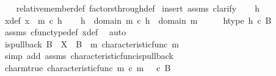 \begin{isabellebody}
%
\isadelimproof
\ \ %
\endisadelimproof
%
\isatagproof
{}\isamarkupfalse%
\ relative{\isacharunderscore}{\kern0pt}member{\isacharunderscore}{\kern0pt}def{}\ factors{\isacharunderscore}{\kern0pt}through{\isacharunderscore}{\kern0pt}def\isanewline
{}\isamarkupfalse%
\ {\isacharparenleft}{\kern0pt}insert\ assms{\isacharcomma}{\kern0pt}\ clarify{\isacharparenright}{\kern0pt}\isanewline
\ \ \isamarkupfalse%
\ h\isanewline
\ \ \isamarkupfalse%
\ x{\isacharunderscore}{\kern0pt}def{\isacharcolon}{\kern0pt}\ {\isachardoublequoteopen}x\ {\isacharequal}{\kern0pt}\ m\ {\isasymcirc}\isactrlsub c\ h{\isachardoublequoteclose}\isanewline
\ \ \isamarkupfalse%
\ {\isachardoublequoteopen}h\ {\isacharcolon}{\kern0pt}\ domain\ {\isacharparenleft}{\kern0pt}m\ {\isasymcirc}\isactrlsub c\ h{\isacharparenright}{\kern0pt}\ {\isasymrightarrow}\ domain\ m{\isachardoublequoteclose}\isanewline
\ \ \isamarkupfalse%
\ \isamarkupfalse%
\ h{\isacharunderscore}{\kern0pt}type{\isacharcolon}{\kern0pt}\ {\isachardoublequoteopen}h\ {\isasymin}\isactrlsub c\ B{\isachardoublequoteclose}\isanewline
\ \ \ \ \isamarkupfalse%
\ assms{\isacharparenleft}{\kern0pt}{}{\isacharcomma}{\kern0pt}{}{\isacharparenright}{\kern0pt}\ cfunc{\isacharunderscore}{\kern0pt}type{\isacharunderscore}{\kern0pt}def\ x{\isacharunderscore}{\kern0pt}def\ \isamarkupfalse%
\ auto\isanewline
\isanewline
\ \ \isamarkupfalse%
\ {\isachardoublequoteopen}is{\isacharunderscore}{\kern0pt}pullback\ B\ {\isasymone}\ X\ {\isasymOmega}\ {\isacharparenleft}{\kern0pt}{\isasymbeta}\isactrlbsub B\isactrlesub {\isacharparenright}{\kern0pt}\ {\isasymt}\ m\ {\isacharparenleft}{\kern0pt}characteristic{\isacharunderscore}{\kern0pt}func\ m{\isacharparenright}{\kern0pt}{\isachardoublequoteclose}\isanewline
\ \ \ \ \isamarkupfalse%
\ {\isacharparenleft}{\kern0pt}simp\ add{\isacharcolon}{\kern0pt}\ assms\ characteristic{\isacharunderscore}{\kern0pt}func{\isacharunderscore}{\kern0pt}is{\isacharunderscore}{\kern0pt}pullback{\isacharparenright}{\kern0pt}\isanewline
\ \ \isamarkupfalse%
\ \isamarkupfalse%
\ char{\isacharunderscore}{\kern0pt}m{\isacharunderscore}{\kern0pt}true{\isacharcolon}{\kern0pt}\ {\isachardoublequoteopen}characteristic{\isacharunderscore}{\kern0pt}func\ m\ {\isasymcirc}\isactrlsub c\ m\ {\isacharequal}{\kern0pt}\ {\isasymt}\ {\isasymcirc}\isactrlsub c\ {\isasymbeta}\isactrlbsub B\isactrlesub {\isachardoublequoteclose}\isanewline

\end{isabellebody}
